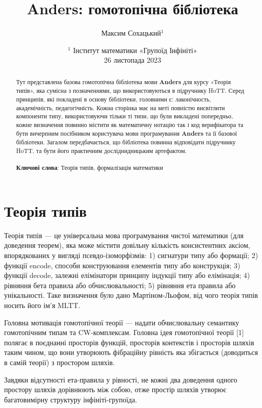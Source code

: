 \documentclass{article}
\theoremstyle{definition}
\begin{document}
\title{Anders: гомотопічна бібліотека}
\author{Максим Сохацький$^1$ }
\date{ \small $^1$ Інститут математики «Групоїд Інфініті» \\
       26 листопада 2023 }
\maketitle

\begin{abstract}
Тут представлена базова гомотопічна бібліотека мови {\bf Anders} для курсу «Теорія типів»,
яка сумісна з позначеннями, що використовуються в підручнику HoTT.
Серед принципів, які покладені в основу бібліотеки, головними є:
лаконічность, академічність, педагогічність. Кожна сторінка має
на меті повністю висвітлити компоненти типу, використовуючи тільки
ті типи, що були викладені попередньо, кожне визначення повинно
містити як математичну нотацію так і код верифікатора та бути
вичерпним посібником користувача мови програмування {\bf Anders} та
її базової бібліотеки. Загалом передбачається, що бібліотека
повинна відповідати підручнику HoTT, та бути його практичним
досліднидницьким артефактом.
\\
\\
{\bf Ключові слова}: Теорія типів, формалізація математики
\end{abstract}

\section*{Теорія типів}
Теорія типів --- це універсальна мова програмування чистої
математики (для доведення теорем), яка може містити довільну
кількість консистентних аксіом, впорядкованих у вигляді псевдо-ізоморфізмів:
1) сигнатури типу або формації;
2) функції encode, способи конструювання елементів типу або конструкція;
3) функції decode, залежні елімінатори принципу індукції типу або елімінація;
4) рівняння бета правила або обчислювальності;
5) рівняння ета правила або унікальності.
Таке визначення було дано Мартіном-Льофом,
від чого теорія типів носить його ім'я MLTT.

Головна мотивація гомотопічної теорії — надати обчислювальну
семантику гомотопічним типам та CW-комплексам. Головна ідея
гомотопічної теорії [1] полягає в поєднанні просторів функцій,
просторів контекстів  і просторів шляхів  таким чином, що вони
утворюють фібраційну рівність яка збігається (доводиться в самій
теорії) з простором шляхів.

Завдяки відсутності ета-правила у рівності, не кожні два
доведення одного простору шляхів дорівнюють між собою, отже
простір шляхів утворює багатовимірну структуру інфініті-групоїда.
\end{document}
